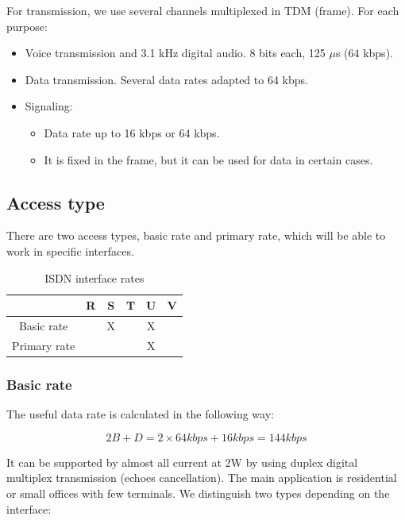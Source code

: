 \documentclass[../main.tex]{subfiles}
\begin{document}
For transmission, we use several channels multiplexed in TDM (frame). For each purpose:

\begin{itemize}
	\item Voice transmission and 3.1 kHz digital audio. 8 bits each, 125 $\mu$s (64 kbps).
	\item Data transmission. Several data rates adapted to 64 kbps.
	\item {
		Signaling:
		\begin{itemize}
			\item Data rate up to 16 kbps or 64 kbps.
			\item It is fixed in the frame, but it can be used for data in certain cases.
		\end{itemize}
	}
\end{itemize}

\subsection{Access type}

There are two access types, basic rate and primary rate, which will be able to work in specific interfaces.

\begin{table}[H]
	\centering
	\begin{tabular}{|c|c|c|c|c|c|}
		\hline
		& R & S & T & U & V \\
		\hline
		Basic rate & & X & & X & \\
		\hline
		Primary rate & & & & X & \\
		\hline
	\end{tabular}
	\caption{
		\label{tab:isdn_interfaces_rates}
		ISDN interface rates
	}
\end{table}

\subsubsection{Basic rate}

The useful data rate is calculated in the following way:

$$
	2B + D = 2 \times 64 kbps + 16 kbps = 144 kbps
$$

It can be supported by almost all current at 2W by using duplex digital multiplex transmission (echoes cancellation). The main application is residential or small offices with few terminals. We distinguish two types depending on the interface:
\end{document}
